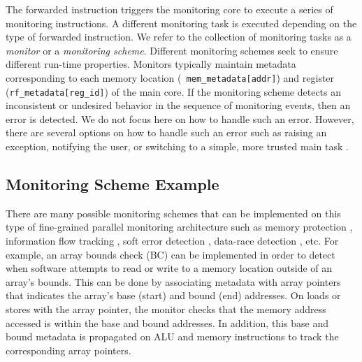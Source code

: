 The forwarded instruction triggers the monitoring core to execute a series of
monitoring instructions.  A different monitoring task is executed depending on
the type of forwarded instruction. We refer to the collection of monitoring
tasks as a \emph{monitor} or a \emph{monitoring scheme}. Different monitoring
schemes seek to ensure different run-time properties.  Monitors typically
maintain metadata corresponding to each memory location ({\tt
mem\_metadata[addr]}) and register ({\tt rf\_metadata[reg\_id]}) of the main
core.  If the monitoring scheme detects an inconsistent or undesired behavior
in the sequence of monitoring events, then an error is detected. We do not
focus here on how to handle such an error. However, there are several options
on how to handle such an error such as raising an exception, notifying the
user, or switching to a simple, more trusted main task \cite{sha-simplex-sw01}.

\subsection{Monitoring Scheme Example}

There are many possible monitoring schemes that can be implemented on this type
of fine-grained parallel monitoring architecture such as memory protection
\cite{mondrian-asplos02}, information flow tracking \cite{dift-asplos04,
testudo-micro08}, soft error detection \cite{argus-micro07}, data-race
detection \cite{cord-hpca06, eraser-tocs97, literace-pldi09, pacer-pldi10},
etc.  For example, an array bounds check (BC) \cite{hardbound-asplos08} can be
implemented in order to detect when software attempts to read or write to a
memory location outside of an array's bounds. This can be done by associating
metadata with array pointers that indicates the array's base (start) and bound
(end) addresses. On loads or stores with the array pointer, the monitor checks
that the memory address accessed is within the base and bound addresses. In
addition, this base and bound metadata is propagated on ALU and memory
instructions to track the corresponding array pointers.

